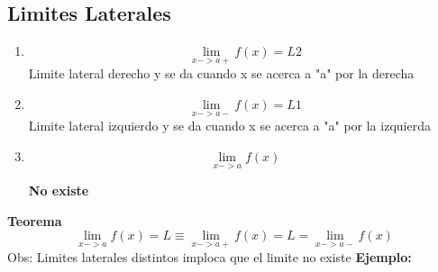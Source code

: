 \documentclass{article}
\begin{document}
            \subsection{Limites Laterales}
            \begin{enumerate}
                \item \begin{equation}
                    \lim_{x->a+} f(x) = L2
                \end{equation}
                Limite lateral derecho y se da cuando x se acerca a "a" por la derecha
                \item \begin{equation}
                    \lim_{x->a-} f(x) = L1
                \end{equation}
                Limite lateral izquierdo y se da cuando x se acerca a "a" por la izquierda
                \item \begin{equation}
                    \lim_{x->a} f(x)
                \end{equation}\begin{center}
                    \textbf{No existe}
                \end{center}
            \end{enumerate}
            \textbf{Teorema}
             \newline   
            \begin{equation}
                    \lim_{x->a} f(x) =L \equiv \lim_{x->a+} f(x) = L = \lim_{x->a-} f(x)
            \end{equation} Obs: Limites laterales distintos imploca que el limite no existe
            \newline \textbf{Ejemplo:}
\end{document}
